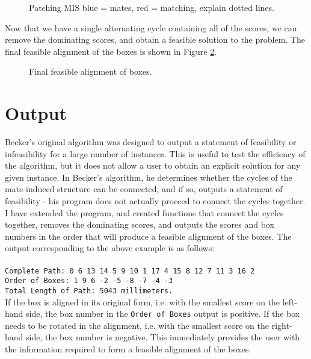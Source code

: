 \documentclass[a4paper, 11pt, twoside, onecolumn, openany]{article}
\newcommand{\code}[1]{\colorbox{light-gray}{\texttt{#1}}}
\begin{document}
\begin{figure}[!htb]
	\centering
	
	\caption{Patching MIS blue = mates, red = matching, explain dotted lines.}
	\label{fig:patch}	
\end{figure}


Now that we have a single alternating cycle containing all of the scores, we can remove the dominating scores, and obtain a feasible solution to the problem. The final feasible alignment of the boxes is shown in Figure \ref{fig:path}.


\begin{figure}[!htb]
	\centering
	
	\caption{Final feasible alignment of boxes.}	
	\label{fig:path}
\end{figure}

\section{Output}
Becker's original algorithm was designed to output a statement of feasibility or infeasibility for a large number of instances. This is useful to test the efficiency of the algorithm, but it does not allow a user to obtain an explicit solution for any given instance. In Becker's algorithm, he determines whether the cycles of the mate-induced structure can be connected, and if so, outputs a statement of feasibility - his program does not actually proceed to connect the cycles together. I have extended the program, and created functions that connect the cycles together, removes the dominating scores, and outputs the scores and box numbers in the order that will produce a feasible alignment of the boxes. The output corresponding to the above example is as follows:\\
\\
\code{Complete Path: 0 6 13 14 5 9 10 1 17 4 15 8 12 7 11 3 16 2}\\
\code{Order of Boxes: 1 9 6 -2 -5 -8 -7 -4 -3}\\
\code{Total Length of Path: 5043 millimeters.}\\


If the box is aligned in its original form, i.e. with the smallest score on the left-hand side, the box number in the \texttt{Order of Boxes} output is positive. If the box needs to be rotated in the alignment, i.e. with the smallest score on the right-hand side, the box number is negative. This immediately provides the user with the information required to form a feasible alignment of the boxes.
\end{document}
